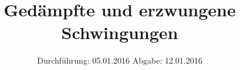 

\subject{Versuch: 354}
\title{Gedämpfte und erzwungene Schwingungen}
\date{
  Durchführung: 05.01.2016
  \hspace{3em}
  Abgabe: 12.01.2016
}



\maketitle
\thispagestyle{empty}
\tableofcontents
\newpage






\printbibliography


